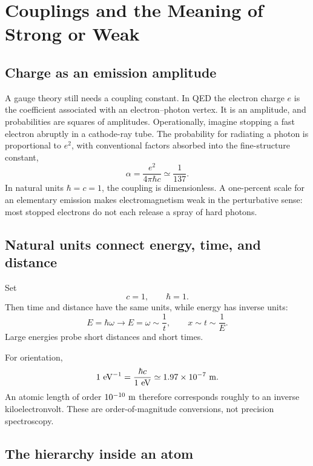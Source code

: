 \section{Couplings and the Meaning of Strong or Weak}

\subsection{Charge as an emission amplitude}

A gauge theory still needs a coupling constant. In QED the electron charge
\(e\) is the coefficient associated with an electron--photon vertex. It is an
amplitude, and probabilities are squares of amplitudes. Operationally,
imagine stopping a fast electron abruptly in a cathode-ray tube. The
probability for radiating a photon is proportional to \(e^2\), with conventional
factors absorbed into the fine-structure constant,
\begin{equation}
\alpha=\frac{e^2}{4\pi\hbar c}
\simeq \frac{1}{137}.
\label{eq:l5-alpha}
\end{equation}
In natural units \(\hbar=c=1\), the coupling is dimensionless. A one-percent
scale for an elementary emission makes electromagnetism weak in the
perturbative sense: most stopped electrons do not each release a spray of
hard photons.

\subsection{Natural units connect energy, time, and distance}

Set
\begin{equation}
c=1,
\qquad
\hbar=1.
\end{equation}
Then time and distance have the same units, while energy has inverse units:
\begin{equation}
E=\hbar\omega\longrightarrow E=\omega\sim\frac1t,
\qquad
x\sim t\sim\frac1E.
\end{equation}
Large energies probe short distances and short times.

For orientation,
\begin{equation}
1\ {\rm eV}^{-1}
=\frac{\hbar c}{1\ {\rm eV}}
\simeq 1.97\times10^{-7}\ {\rm m}.
\end{equation}
An atomic length of order \(10^{-10}\ {\rm m}\) therefore corresponds roughly
to an inverse kiloelectronvolt. These are order-of-magnitude conversions, not
precision spectroscopy.

\subsection{The hierarchy inside an atom}

